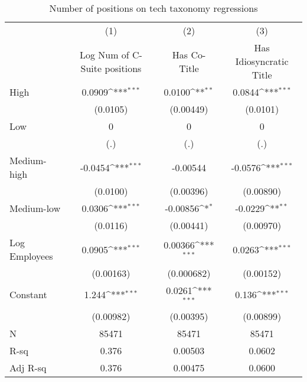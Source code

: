 \begin{table}[htbp]\centering
\def\sym#1{\ifmmode^{#1}\else\(^{#1}\)\fi}
\caption{Number of positions on tech taxonomy regressions\label{tab1}}
\begin{tabular}{l*{3}{c}}
\toprule
                    &\multicolumn{1}{c}{(1)}&\multicolumn{1}{c}{(2)}&\multicolumn{1}{c}{(3)}\\
                    &\multicolumn{1}{c}{Log Num of C-Suite positions}&\multicolumn{1}{c}{Has Co- Title}&\multicolumn{1}{c}{Has Idiosyncratic Title}\\
\midrule
 High               &      0.0909\sym{***}&      0.0100\sym{**} &      0.0844\sym{***}\\
                    &    (0.0105)         &   (0.00449)         &    (0.0101)         \\
\addlinespace
 Low                &           0         &           0         &           0         \\
                    &         (.)         &         (.)         &         (.)         \\
\addlinespace
 Medium-high        &     -0.0454\sym{***}&    -0.00544         &     -0.0576\sym{***}\\
                    &    (0.0100)         &   (0.00396)         &   (0.00890)         \\
\addlinespace
 Medium-low         &      0.0306\sym{***}&    -0.00856\sym{*}  &     -0.0229\sym{**} \\
                    &    (0.0116)         &   (0.00441)         &   (0.00970)         \\
\addlinespace
Log Employees       &      0.0905\sym{***}&     0.00366\sym{***}&      0.0263\sym{***}\\
                    &   (0.00163)         &  (0.000682)         &   (0.00152)         \\
\addlinespace
Constant            &       1.244\sym{***}&      0.0261\sym{***}&       0.136\sym{***}\\
                    &   (0.00982)         &   (0.00395)         &   (0.00899)         \\
\midrule
N                   &       85471         &       85471         &       85471         \\
R-sq                &       0.376         &     0.00503         &      0.0602         \\
Adj R-sq            &       0.376         &     0.00475         &      0.0600         \\

\end{tabular}
\end{table}
